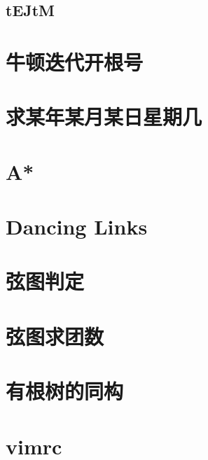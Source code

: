 \documentclass[a4paper,10pt]{book}
\begin{document}
		\subsection{tEJtM}
			
    
    \section{牛顿迭代开根号}
        

    \section{求某年某月某日星期几}
        
	
	\section{A*}
		

	\section{Dancing Links}
		

	\section{弦图判定}
		
	
	\section{弦图求团数}
		

	\section{有根树的同构}
		

	\section{vimrc}
		
\end{document}
